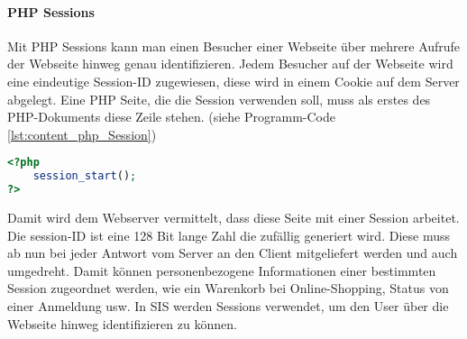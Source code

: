 \paragraph{PHP Sessions}
Mit PHP Sessions kann man einen Besucher einer Webseite über mehrere Aufrufe der Webseite hinweg genau identifizieren. Jedem Besucher auf der Webseite wird eine eindeutige Session-ID zugewiesen, diese wird in einem Cookie auf dem Server abgelegt. Eine PHP Seite, die die Session verwenden soll, muss als erstes des PHP-Dokuments diese Zeile stehen. (siehe Programm-Code \ref{lst:content_php_Session})
\begin{lstlisting}[style=custom, language=PHP, caption={Session},label={lst:content_php_Session}]
<?php
	session_start();
?>
\end{lstlisting}

Damit wird dem Webserver vermittelt, dass diese Seite mit einer Session arbeitet.\\
Die session-ID ist eine 128 Bit lange Zahl die zufällig generiert wird. Diese muss ab nun bei jeder Antwort vom Server an den Client mitgeliefert werden und auch umgedreht. Damit können personenbezogene Informationen einer bestimmten Session zugeordnet werden, wie ein Warenkorb bei Online-Shopping, Status von einer Anmeldung usw. In SIS werden Sessions verwendet, um den User über die Webseite hinweg identifizieren zu können. 
